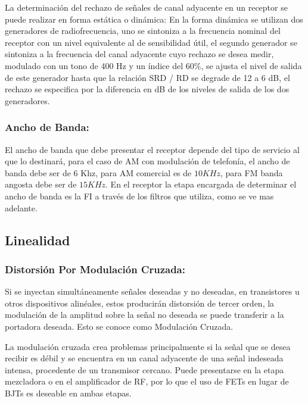 \documentclass[a4paper,10pt,spanish]{report}
\let\sphinxpxdimen\pdfpxdimen\else\newdimen\sphinxpxdimen
\begin{document}
\sphinxincludegraphics[width=1300\sphinxpxdimen,height=875\sphinxpxdimen]{{selectividad}.png}

La determinación del rechazo de señales de canal adyacente en un receptor se puede realizar en forma estática o dinámica: En la forma dinámica se utilizan dos generadores de radiofrecuencia, uno se sintoniza a la frecuencia nominal del receptor con un nivel equivalente al de sensibilidad útil, el segundo generador se sintoniza a la frecuencia del canal adyacente cuyo rechazo se desea medir, modulado con un tono de 400 Hz y un índice del \(60\%\), se ajusta el nivel de salida de este
generador hasta que la relación SRD / RD se degrade de 12 a 6 dB, el rechazo se especifica por la diferencia en dB de los niveles de salida de los dos generadores.

\sphinxincludegraphics[width=1167\sphinxpxdimen,height=867\sphinxpxdimen]{{selectividad2}.png}


\subsubsection{Ancho de Banda:}
\label{\detokenize{introduccion/sistemas:Ancho-de-Banda:}}
El ancho de banda que debe presentar el receptor depende del tipo de servicio al que lo destinará, para el caso de AM con modulación de telefonía, el ancho de banda debe ser de 6 Khz, para AM comercial es de \(10 KHz\), para FM banda angosta debe ser de \(15 KHz\). En el receptor la etapa encargada de determinar el ancho de banda es la FI a través de los filtros que utiliza, como se ve mas adelante.


\subsection{Linealidad}
\label{\detokenize{introduccion/sistemas:Linealidad}}

\subsubsection{Distorsión Por Modulación Cruzada:}
\label{\detokenize{introduccion/sistemas:Distorsi_xf3n-Por-Modulaci_xf3n-Cruzada:}}
Si se inyectan simultáneamente señales deseadas y no deseadas, en transistores u otros dispositivos alinéales, estos producirán distorsión de tercer orden, la modulación de la amplitud sobre la señal no deseada se puede transferir a la portadora deseada. Esto se conoce como Modulación Cruzada.

La modulación cruzada crea problemas principalmente si la señal que se desea recibir es débil y se encuentra en un canal adyacente de una señal indeseada intensa, procedente de un transmisor cercano. Puede presentarse en la etapa mezcladora o en el amplificador de RF, por lo que el uso de FETs en lugar de BJTs es deseable en ambas etapas.
\end{document}
